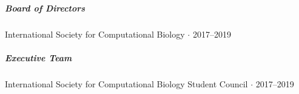 \documentclass[10pt,letterpaper]{article}
\newcommand{\bigdot}{$\cdot$\xspace}
\begin{document}
\subparagraph{Board of Directors}
International Society for Computational Biology  \bigdot 2017--2019

\subparagraph{Executive Team}
International Society for Computational Biology Student Council \bigdot 2017--2019
\end{document}

